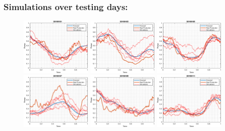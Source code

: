 \documentclass[aspectratio=169]{beamer}\usepackage[utf8]{inputenc}
\begin{document}

\begin{frame}\frametitle{Simulations over testing days:}

\begin{figure}[ht!]
\centering
\includegraphics[width=0.3\textwidth]{../../MATLAB_Files/Results/paths_testing_days/optimal_value/1.eps}
\includegraphics[width=0.3\textwidth]{../../MATLAB_Files/Results/paths_testing_days/optimal_value/2.eps}
\includegraphics[width=0.3\textwidth]{../../MATLAB_Files/Results/paths_testing_days/optimal_value/3.eps}
\includegraphics[width=0.3\textwidth]{../../MATLAB_Files/Results/paths_testing_days/optimal_value/4.eps}
\includegraphics[width=0.3\textwidth]{../../MATLAB_Files/Results/paths_testing_days/optimal_value/5.eps}
\includegraphics[width=0.3\textwidth]{../../MATLAB_Files/Results/paths_testing_days/optimal_value/6.eps}
\end{figure}

\end{frame}
\end{document}
